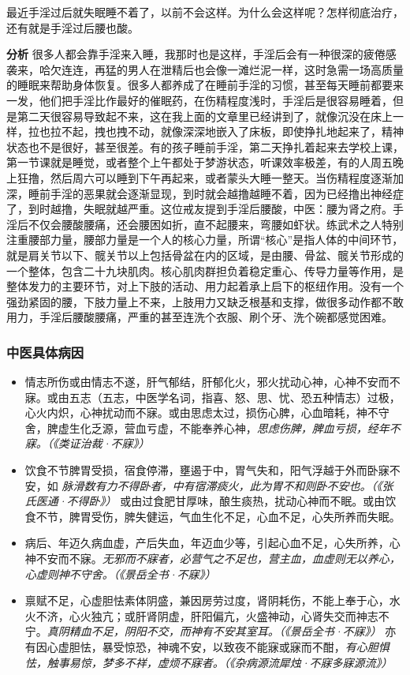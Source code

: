 \begin{case}
    最近手淫过后就失眠睡不着了，以前不会这样。为什么会这样呢？怎样彻底治疗，还有就是手淫过后腰也酸。

    \textbf{分析} 很多人都会靠手淫来入睡，我那时也是这样，手淫后会有一种很深的疲倦感袭来，哈欠连连，再猛的男人在泄精后也会像一滩烂泥一样，这时急需一场高质量的睡眠来帮助身体恢复。很多人都养成了在睡前手淫的习惯，甚至每天睡前都要来一发，他们把手淫比作最好的催眠药，在伤精程度浅时，手淫后是很容易睡着，但是第二天很容易导致起不来，这在我上面的文章里已经讲到了，就像沉没在床上一样，拉也拉不起，拽也拽不动，就像深深地嵌入了床板，即使挣扎地起来了，精神状态也不是很好，甚至很差。有的孩子睡前手淫，第二天挣扎着起来去学校上课，第一节课就是睡觉，或者整个上午都处于梦游状态，听课效率极差，有的人周五晚上狂撸，然后周六可以睡到下午再起来，或者蒙头大睡一整天。当伤精程度逐渐加深，睡前手淫的恶果就会逐渐显现，到时就会越撸越睡不着，因为已经撸出神经症了，到时越撸，失眠就越严重。这位戒友提到手淫后腰酸，中医：腰为肾之府。手淫后不仅会腰酸腰痛，还会腰困如折，直不起腰来，弯腰如虾状。练武术之人特别注重腰部力量，腰部力量是一个人的核心力量，所谓“核心”是指人体的中间环节，就是肩关节以下、髋关节以上包括骨盆在内的区域，是由腰、骨盆、髋关节形成的一个整体，包含二十九块肌肉。核心肌肉群担负着稳定重心、传导力量等作用，是整体发力的主要环节，对上下肢的活动、用力起着承上启下的枢纽作用。没有一个强劲紧固的腰，下肢力量上不来，上肢用力又缺乏根基和支撑，做很多动作都不敢用力，手淫后腰酸腰痛，严重的甚至连洗个衣服、刷个牙、洗个碗都感觉困难。
\end{case}

\subsubsection{中医具体病因}

\begin{itemize}
    \item 情志所伤或由情志不遂，肝气郁结，肝郁化火，邪火扰动心神，心神不安而不寐。或由五志（五志，中医学名词，指喜、怒、思、忧、恐五种情志）过极，心火内炽，心神扰动而不寐。或由思虑太过，损伤心脾，心血暗耗，神不守舍，脾虚生化乏源，营血亏虚，不能奉养心神，\textit{思虑伤脾，脾血亏损，经年不寐。（《类证治裁·不寐》）}
    \item 饮食不节脾胃受损，宿食停滞，壅遏于中，胃气失和，阳气浮越于外而卧寐不安，如 \textit{脉滑数有力不得卧者，中有宿滞痰火，此为胃不和则卧不安也。（《张氏医通·不得卧》）} 或由过食肥甘厚味，酿生痰热，扰动心神而不眠。或由饮食不节，脾胃受伤，脾失健运，气血生化不足，心血不足，心失所养而失眠。
    \item 病后、年迈久病血虚，产后失血，年迈血少等，引起心血不足，心失所养，心神不安而不寐。\textit{无邪而不寐者，必营气之不足也，营主血，血虚则无以养心，心虚则神不守舍。（《景岳全书·不寐》）}
    \item 禀赋不足，心虚胆怯素体阴盛，兼因房劳过度，肾阴耗伤，不能上奉于心，水火不济，心火独亢；或肝肾阴虚，肝阳偏亢，火盛神动，心肾失交而神志不宁。\textit{真阴精血不足，阴阳不交，而神有不安其室耳。（《景岳全书·不寐》）} 亦有因心虚胆怯，暴受惊恐，神魂不安，以致夜不能寐或寐而不酣，\textit{有心胆惧怯，触事易惊，梦多不祥，虚烦不寐者。（《杂病源流犀烛·不寐多寐源流》）}
\end{itemize}

